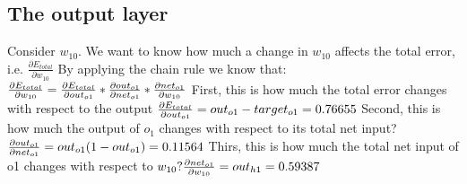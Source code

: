 \documentclass[12pt]{article}
\begin{document}
\subsection{The output layer}
Consider 
\begin{math}w_{10}\end{math}.
We want to know how much a change in 
\begin{math}w_{10}\end{math} 
affects the total error, i.e.  
\begin{math}
\frac{\partial E_{total}}{\partial w_{10}}
\end{math}
By applying the chain rule we know that:
\begin{math}
\newline\newline
\frac{\partial E_{total}}{\partial w_{10}} = \frac{\partial E_{total}}{\partial out_{o1}} * \frac{\partial out_{o1}}{\partial net_{o1}} * \frac{\partial net_{o1}}{\partial w_{10}}
\newline\newline
\end{math}
First, this is how much the total error changes with respect to the output
\begin{math}
\newline\newline
\frac{\partial E_{total}}{\partial out_{o1}} = out_{o1} - target_{o1} = 0.76655
\newline\newline
\end{math}
Second, this is how much the output of
\begin{math}o_1\end{math}
changes with respect to its total net input?
\begin{math}
\newline\newline
\frac{\partial out_{o1}}{\partial net_{o1}} = out_{o1}(1 - out_{o1}) = 0.11564
\newline\newline
\end{math}
Thirs, this is how much the total net input of o1 changes with respect to 
\begin{math}w_{10}?
\newline\newline
\frac{\partial net_{o1}}{\partial w_{10}} = out_{h1} = 0.59387
\newline\newline
\end{math}
\end{document}
